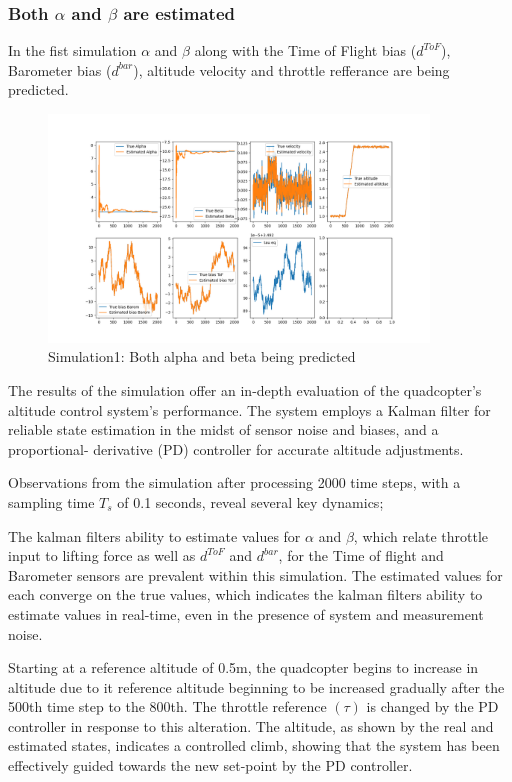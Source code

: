 \documentclass{article}
\begin{document}
\subsubsection*{Both \(\alpha\) and \(\beta\) are estimated}
In the fist simulation \(\alpha\) and \(\beta\) along with the Time of Flight bias (\(d^{ToF}\)), Barometer bias (\(d^{bar}\)), altitude velocity and throttle refferance are being predicted.
\begin{figure}[H]
  \centering
  \includegraphics[width=0.9\textwidth]{Pictures/no_constant_PD.png}
  \caption{Simulation1: Both alpha and beta being predicted}
  \label{fig:no_constant_PD}
\end{figure}
The results of the simulation offer an in-depth evaluation of the quadcopter's altitude control system's performance. The system employs a Kalman filter for reliable state estimation in the midst of sensor noise and biases, and a proportional- derivative (PD) controller for accurate altitude adjustments.

Observations from the simulation after processing 2000 time steps, with a sampling time \(T_s\) of 0.1 seconds, reveal several key dynamics;

The kalman filters ability to estimate values for \(\alpha\) and \(\beta\), which relate throttle input to lifting force as well as \(d^{ToF}\) and \(d^{bar}\), for the Time of flight and Barometer sensors are prevalent within this simulation. The estimated values for each converge on the true values, which indicates the kalman filters
ability to estimate values in real-time, even in the presence of system and measurement noise.

Starting at a reference altitude of 0.5m, the quadcopter begins to increase in altitude due to it reference altitude beginning to be increased gradually after the 500th time step to the 800th. The throttle reference \((\tau)\) is changed by the PD controller in response to this alteration. The altitude, as shown by the real 
and estimated states, indicates a controlled climb, showing that the system has been effectively guided towards the new set-point by the PD controller.
\end{document}
